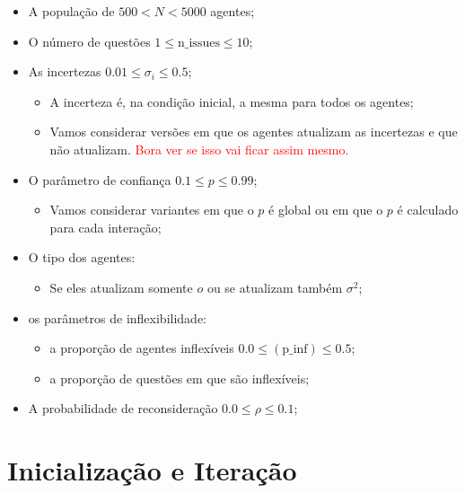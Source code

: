 \begin{itemize}
\item A população de \(500 < N < 5000\) agentes;
\item O número de questões \(1 \leq \text{n\_issues} \leq 10\); 

\item As incertezas \(0.01 \leq \sigma_i \leq 0.5\);
  \begin{itemize}
  \item A incerteza é, na condição inicial, a mesma para todos os agentes;
  \item Vamos considerar versões em que os agentes atualizam as incertezas e que
    não atualizam. \textcolor{red}{Bora ver se isso vai ficar assim mesmo.}
  \end{itemize}

\item O parâmetro de confiança \(0.1 \leq p \leq 0.99\);
  
  \begin{itemize}
  \item Vamos considerar variantes em que o \(p\) é global ou em que o \(p\) é
    calculado para cada interação;
  \end{itemize}

\item O tipo dos agentes:
  \begin{itemize}
  \item Se eles atualizam somente \(o\) ou se atualizam também \(\sigma^2\);
  \end{itemize}

\item os parâmetros de inflexibilidade:
  \begin{itemize}
  \item a proporção de agentes inflexíveis \(0.0 \leq (\text{p\_inf}) \leq 0.5\);
  \item a proporção de questões em que são inflexíveis;
  \end{itemize}

\item A probabilidade de reconsideração \(0.0 \leq \rho  \leq 0.1\);
  
\end{itemize}

\section{Inicialização e Iteração}


